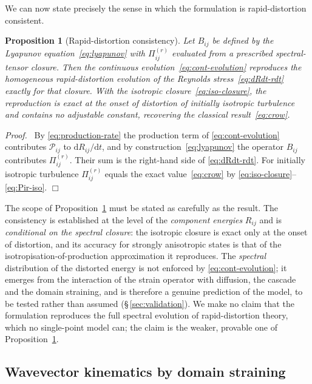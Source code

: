 \documentclass[lineno]{JFM-FLM_Au}
\newtheorem{proposition}{Proposition}
\newenvironment{proof}
  {\par\noindent\textit{Proof.}\ }
  {\hfill$\Box$\par}
\begin{document}
We can now state precisely the sense in which the formulation is
rapid-distortion consistent.

\begin{proposition}[Rapid-distortion consistency]\label{prop:rdt}
Let $B_{ij}$ be defined by the Lyapunov equation~\eqref{eq:lyapunov} with
$\Pi_{ij}^{(r)}$ evaluated from a prescribed spectral-tensor closure. Then
the continuous evolution~\eqref{eq:cont-evolution} reproduces the
homogeneous rapid-distortion evolution of the Reynolds
stress~\eqref{eq:dRdt-rdt} exactly for that closure. With the isotropic
closure~\eqref{eq:iso-closure}, the reproduction is exact at the onset of
distortion of initially isotropic turbulence and contains no adjustable
constant, recovering the classical result~\eqref{eq:crow}.
\end{proposition}

\begin{proof}
By \eqref{eq:production-rate} the production term of
\eqref{eq:cont-evolution} contributes $\mathcal{P}_{ij}$ to
$\mathrm{d}R_{ij}/\mathrm{d}t$, and by construction~\eqref{eq:lyapunov} the
operator $B_{ij}$ contributes $\Pi_{ij}^{(r)}$. Their sum is the
right-hand side of \eqref{eq:dRdt-rdt}. For initially isotropic turbulence
$\Pi_{ij}^{(r)}$ equals the exact value~\eqref{eq:crow} by
\eqref{eq:iso-closure}--\eqref{eq:Pir-iso}.
\end{proof}

The scope of Proposition~\ref{prop:rdt} must be stated as carefully as the
result. The consistency is established at the level of the
\emph{component energies} $R_{ij}$ and is \emph{conditional on the spectral
closure}: the isotropic closure is exact only at the onset of distortion,
and its accuracy for strongly anisotropic states is that of the
isotropisation-of-production approximation it reproduces. The
\emph{spectral} distribution of the distorted energy is not enforced by
\eqref{eq:cont-evolution}; it emerges from the interaction of the strain
operator with diffusion, the cascade and the domain straining, and is
therefore a genuine prediction of the model, to be tested rather than
assumed (\S\,\ref{sec:validation}). We make no claim that the formulation
reproduces the full spectral evolution of rapid-distortion theory, which no
single-point model can; the claim is the weaker, provable one of
Proposition~\ref{prop:rdt}.

\subsection{Wavevector kinematics by domain straining}\label{sec:domain-strain}
\end{document}
